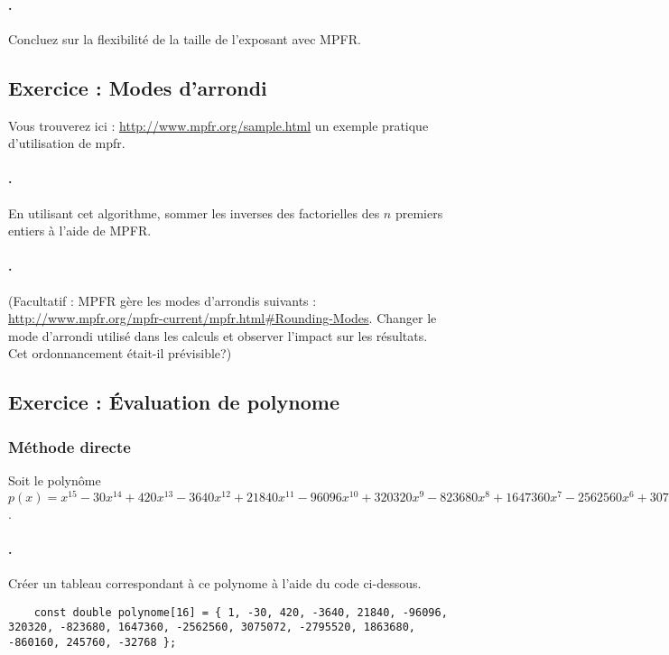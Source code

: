 \documentclass[a4paper,11pt]{exam}
\begin{document}
\paragraph{\theenumii.} 
Concluez sur la flexibilité de la taille de l'exposant avec MPFR.


\setcounter{enumii}{1}
\subsection{Exercice \theenumi : Modes d'arrondi}
Vous trouverez ici : \url{http://www.mpfr.org/sample.html} un exemple pratique d'utilisation de mpfr.
\paragraph{\theenumii.}En utilisant cet algorithme, sommer les inverses des factorielles des $n$ premiers entiers à l'aide de MPFR.
\paragraph{\theenumii.}(Facultatif : MPFR gère les modes d'arrondis suivants : \url{http://www.mpfr.org/mpfr-current/mpfr.html#Rounding-Modes}. Changer le mode d'arrondi utilisé dans les calculs et observer l'impact sur les résultats. \\ 
Cet ordonnancement était-il prévisible?)

\setcounter{enumii}{1}

\subsection{Exercice \theenumi : Évaluation de polynome}
\subsubsection{Méthode directe}
Soit le polynôme $p(x) = x^{15} - 30x^{14} + 420x^{13} - 3640x^{12} + 21840x^{11} -96096x^{10} + 320320x^{9} -823680x^{8}+ 1647360x^{7} -2562560x^{6}+ 3075072x^{5} -2795520x^{4}+ 1863680x^{3} -860160x^{2}+ 245760x -32768 $.
\paragraph{\theenumii.} Créer un tableau correspondant à ce polynome à l'aide du code ci-dessous.
\begin{lstlisting}
	const double polynome[16] = { 1, -30, 420, -3640, 21840, -96096, 320320, -823680, 1647360, -2562560, 3075072, -2795520, 1863680, -860160, 245760, -32768 };
\end{lstlisting}
\end{document}

